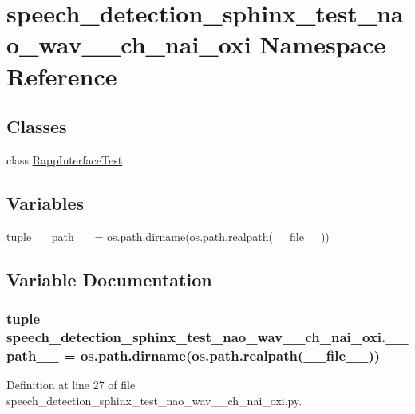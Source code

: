 \hypertarget{namespacespeech__detection__sphinx__test__nao__wav__1__ch__nai__oxi}{\section{speech\-\_\-detection\-\_\-sphinx\-\_\-test\-\_\-nao\-\_\-wav\-\_\-\_\-ch\-\_\-nai\-\_\-oxi Namespace Reference}
\label{namespacespeech__detection__sphinx__test__nao__wav__1__ch__nai__oxi}
}
\subsection*{Classes}
\begin{DoxyCompactItemize}
\item 
class \hyperlink{classspeech__detection__sphinx__test__nao__wav__1__ch__nai__oxi_1_1RappInterfaceTest}{Rapp\-Interface\-Test}
\end{DoxyCompactItemize}
\subsection*{Variables}
\begin{DoxyCompactItemize}
\item 
tuple \hyperlink{namespacespeech__detection__sphinx__test__nao__wav__1__ch__nai__oxi_a6c852e200b8fd7f714c465db38993cbf}{\-\_\-\-\_\-path\-\_\-\-\_\-} = os.\-path.\-dirname(os.\-path.\-realpath(\-\_\-\-\_\-file\-\_\-\-\_\-))
\end{DoxyCompactItemize}


\subsection{Variable Documentation}
\hypertarget{namespacespeech__detection__sphinx__test__nao__wav__1__ch__nai__oxi_a6c852e200b8fd7f714c465db38993cbf}{
\subsubsection[{\-\_\-\-\_\-path\-\_\-\-\_\-}]{\setlength{\rightskip}{0pt plus 5cm}tuple speech\-\_\-detection\-\_\-sphinx\-\_\-test\-\_\-nao\-\_\-wav\-\_\-\_\-ch\-\_\-nai\-\_\-oxi.\-\_\-\-\_\-path\-\_\-\-\_\- = os.\-path.\-dirname(os.\-path.\-realpath(\-\_\-\-\_\-file\-\_\-\-\_\-))}}\label{namespacespeech__detection__sphinx__test__nao__wav__1__ch__nai__oxi_a6c852e200b8fd7f714c465db38993cbf}


Definition at line 27 of file speech\-\_\-detection\-\_\-sphinx\-\_\-test\-\_\-nao\-\_\-wav\-\_\-\_\-ch\-\_\-nai\-\_\-oxi.\-py.

